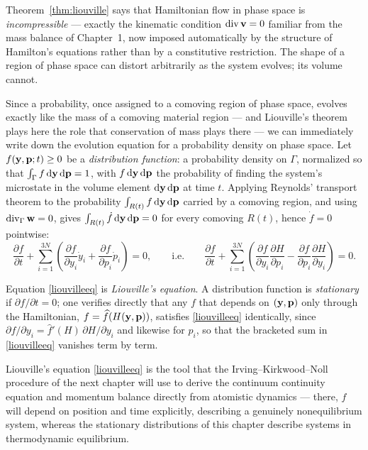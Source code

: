 \begin{remark}
	Theorem~\ref{thm:liouville} says that Hamiltonian flow in phase space is \textit{incompressible} --- exactly the kinematic condition $\operatorname{div}\mathbf{v}=0$ familiar from the mass balance of Chapter~1, now imposed automatically by the structure of Hamilton's equations rather than by a constitutive restriction. The shape of a region of phase space can distort arbitrarily as the system evolves; its volume cannot.
\end{remark}

Since a probability, once assigned to a comoving region of phase space, evolves exactly like the mass of a comoving material region --- and Liouville's theorem plays here the role that conservation of mass plays there --- we can immediately write down the evolution equation for a probability density on phase space. Let $f(\mathbf{y},\mathbf{p};t)\geq0$ be a \textit{distribution function}: a probability density on $\Gamma$, normalized so that $\int_\Gamma f\,\mathrm{d}\mathbf{y}\,\mathrm{d}\mathbf{p}=1$, with $f\,\mathrm{d}\mathbf{y}\,\mathrm{d}\mathbf{p}$ the probability of finding the system's microstate in the volume element $\mathrm{d}\mathbf{y}\,\mathrm{d}\mathbf{p}$ at time $t$. Applying Reynolds' transport theorem to the probability $\int_{R(t)}f\,\mathrm{d}\mathbf{y}\,\mathrm{d}\mathbf{p}$ carried by a comoving region, and using $\operatorname{div}_\Gamma\mathbf{w}=0$, gives $\int_{R(t)}\dot f\,\mathrm{d}\mathbf{y}\,\mathrm{d}\mathbf{p}=0$ for every comoving $R(t)$, hence $\dot f=0$ pointwise:
\begin{equation}\label{liouvilleeq}
	\frac{\partial f}{\partial t} + \sum_{i=1}^{3N}\left(\frac{\partial f}{\partial y_i}\dot y_i + \frac{\partial f}{\partial p_i}\dot p_i\right) = 0, \qquad\text{i.e.}\qquad \frac{\partial f}{\partial t} + \sum_{i=1}^{3N}\left(\frac{\partial f}{\partial y_i}\frac{\partial H}{\partial p_i} - \frac{\partial f}{\partial p_i}\frac{\partial H}{\partial y_i}\right) = 0.
\end{equation}

\begin{definition}
	Equation \eqref{liouvilleeq} is \textit{Liouville's equation}. A distribution function is \textit{stationary} if $\partial f/\partial t=0$; one verifies directly that any $f$ that depends on $(\mathbf{y},\mathbf{p})$ only through the Hamiltonian, $f=\widehat f(H(\mathbf{y},\mathbf{p}))$, satisfies \eqref{liouvilleeq} identically, since $\partial f/\partial y_i = \widehat f'(H)\,\partial H/\partial y_i$ and likewise for $p_i$, so that the bracketed sum in \eqref{liouvilleeq} vanishes term by term.
\end{definition}

\begin{remark}\label{rem:equalapriori}
	Liouville's equation \eqref{liouvilleeq} is the tool that the Irving--Kirkwood--Noll procedure of the next chapter will use to derive the continuum continuity equation and momentum balance directly from atomistic dynamics --- there, $f$ will depend on position and time explicitly, describing a genuinely nonequilibrium system, whereas the stationary distributions of this chapter describe systems in thermodynamic equilibrium.
\end{remark}

